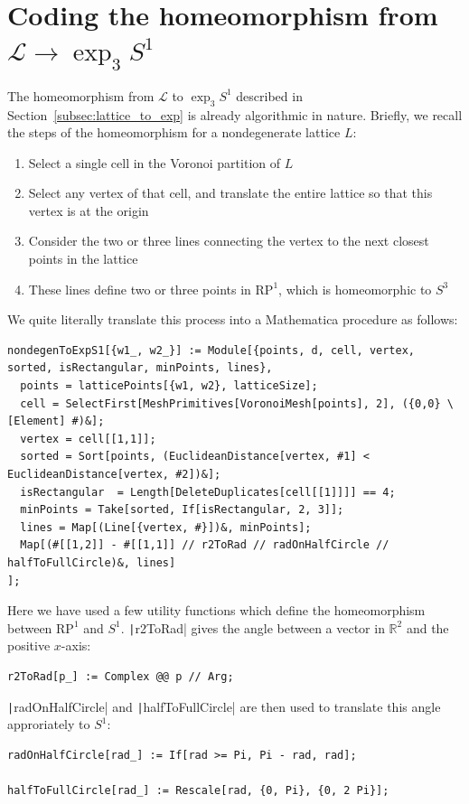 \documentclass[12pt,twoside]{reedthesis}
\theoremstyle{definition}
\newcommand{\R}{\mathbb{R}}
\newcommand{\LS}{\mathcal{L}}
\begin{document}
\section{Coding the homeomorphism from $\LS \to \exp_3 S^1$}

The homeomorphism from $\LS$ to $\exp_3 S^1$ described in Section~\ref{subsec:lattice_to_exp} is already algorithmic in nature.
Briefly, we recall the steps of the homeomorphism for a nondegenerate lattice $L$:
\begin{enumerate}
  \item Select a single cell in the Voronoi partition of $L$
  \item Select any vertex of that cell, and translate the entire lattice so that this vertex is at the origin
  \item Consider the two or three lines connecting the vertex to the next closest points in the lattice
  \item These lines define two or three points in $\mathrm{RP}^1$, which is homeomorphic to $S^3$
\end{enumerate}
We quite literally translate this process into a Mathematica procedure as follows:
\begin{verbatim}
nondegenToExpS1[{w1_, w2_}] := Module[{points, d, cell, vertex, sorted, isRectangular, minPoints, lines},
  points = latticePoints[{w1, w2}, latticeSize];
  cell = SelectFirst[MeshPrimitives[VoronoiMesh[points], 2], ({0,0} \[Element] #)&];
  vertex = cell[[1,1]];
  sorted = Sort[points, (EuclideanDistance[vertex, #1] < EuclideanDistance[vertex, #2])&];
  isRectangular  = Length[DeleteDuplicates[cell[[1]]]] == 4;
  minPoints = Take[sorted, If[isRectangular, 2, 3]];
  lines = Map[(Line[{vertex, #}])&, minPoints];
  Map[(#[[1,2]] - #[[1,1]] // r2ToRad // radOnHalfCircle // halfToFullCircle)&, lines]
];
\end{verbatim}
Here we have used a few utility functions which define the homeomorphism between $\mathrm{RP}^1$ and $S^1$.
\texttt|r2ToRad| gives the angle between a vector in $\R^2$ and the positive $x$-axis:
\begin{verbatim}
r2ToRad[p_] := Complex @@ p // Arg;
\end{verbatim}
\texttt|radOnHalfCircle| and \texttt|halfToFullCircle| are then used to translate this angle approriately to $S^1$:
\begin{verbatim}
radOnHalfCircle[rad_] := If[rad >= Pi, Pi - rad, rad];

halfToFullCircle[rad_] := Rescale[rad, {0, Pi}, {0, 2 Pi}];
\end{verbatim}
\end{document}
